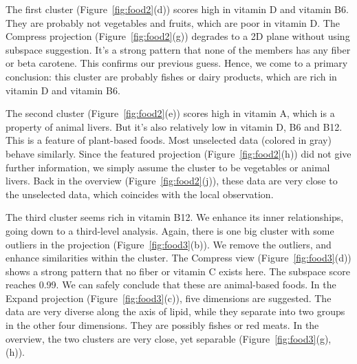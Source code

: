 The first cluster (Figure~\ref{fig:food2}(d)) scores high in vitamin D and vitamin B6. They are probably not vegetables and fruits, which are poor in vitamin D. The Compress projection (Figure~\ref{fig:food2}(g)) degrades to a 2D plane without using subspace suggestion. It's a strong pattern that none of the members has any fiber or beta carotene. This confirms our previous guess. Hence, we come to a primary conclusion: this cluster are probably fishes or dairy products, which are rich in vitamin D and vitamin B6.

The second cluster (Figure~\ref{fig:food2}(e)) scores high in vitamin A, which is a property of animal livers. But it's also relatively low in vitamin D, B6 and B12. This is a feature of plant-based foods. Most unselected data (colored in gray) behave similarly. Since the featured projection (Figure~\ref{fig:food2}(h)) did not give further information, we simply assume the cluster to be vegetables or animal livers. Back in the overview (Figure~\ref{fig:food2}(j)), these data are very close to the unselected data, which coincides with the local observation.

The third cluster seems rich in vitamin B12. We enhance its inner relationships, going down to a third-level analysis. Again, there is one big cluster with some outliers in the projection (Figure~\ref{fig:food3}(b)). We remove the outliers, and enhance similarities within the cluster. The Compress view (Figure~\ref{fig:food3}(d)) shows a strong pattern that no fiber or vitamin C exists here. The subspace score reaches 0.99. We can safely conclude that these are animal-based foods. In the Expand projection (Figure~\ref{fig:food3}(c)), five dimensions are suggested. The data are very diverse along the axis of lipid, while they separate into two groups in the other four dimensions. They are possibly fishes or red meats. In the overview, the two clusters are very close, yet separable (Figure~\ref{fig:food3}(g), (h)).

